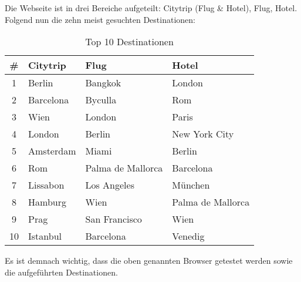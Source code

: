 Die Webseite ist in drei Bereiche aufgeteilt: Citytrip (Flug \& Hotel), Flug, Hotel. Folgend nun die zehn meist gesuchten Destinationen:
\begin{table}[H] 
	\caption{Top 10 Destinationen}
	\centering
	\label{sec:Recherche:Zielgruppe:top10}
	
	\begin{tabular}{ | c | l | l | l | } 
		\hline 
		\textbf{\#} & \textbf{Citytrip} & \textbf{Flug} & \textbf{Hotel} \\ \hline 
		1 & Berlin & Bangkok & London \\ \hline
		2 & Barcelona & Byculla & Rom \\ \hline
		3 & Wien & London & Paris \\ \hline
		4 & London & Berlin & New York City \\ \hline
		5 & Amsterdam & Miami & Berlin \\ \hline
		6 & Rom & Palma de Mallorca & Barcelona \\ \hline
		7 & Lissabon & Los Angeles & München \\ \hline
		8 & Hamburg & Wien  & Palma de Mallorca \\ \hline
		9 & Prag & San Francisco & Wien \\ \hline
		10 & Istanbul & Barcelona & Venedig \\ \hline
	\end{tabular} 
\end{table}

Es ist demnach wichtig, dass die oben genannten Browser getestet werden sowie die aufgeführten Destinationen.